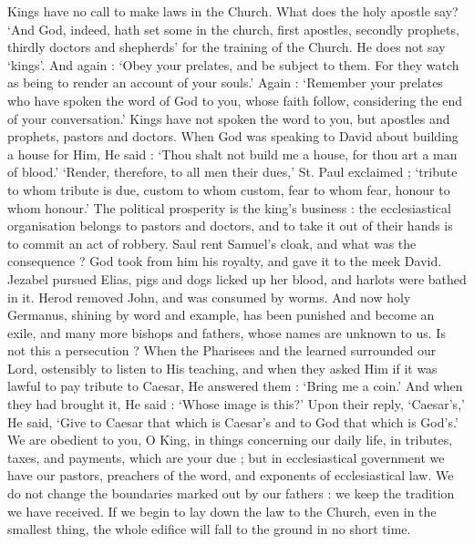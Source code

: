 \documentclass[10pt]{book}
\newcommand{\switchGreek}[1][]{\selectlanguage{polutonikogreek} \switchcolumn*[#1]}
\begin{document}
\begin{paracol}{2}
Kings have no call to make laws in the 
Church. What does the holy apostle say? 
`And God, indeed, hath set some in the church, 
first apostles, secondly prophets, thirdly doctors 
and shepherds' for the training of the Church. 
He does not say `kings'. And again : `Obey 
your prelates, and be subject to them. For 
they watch as being to render an account of 
your souls.' Again : `Remember your prelates 
who have spoken the word of God to you, 
whose faith follow, considering the end of your 
conversation.' Kings have not spoken the 
word to you, but apostles and prophets, 
pastors and doctors. When God was speaking 
to David about building a house for Him, He 
said : `Thou shalt not build me a house, for 
thou art a man of blood.' `Render, therefore, 
to all men their dues,' St. Paul exclaimed ; 
`tribute to whom tribute is due, custom to 
whom custom, fear to whom fear, honour to 
whom honour.' The political prosperity is the 
king's business : the ecclesiastical organisation 
belongs to pastors and doctors, and to take it 
out of their hands is to commit an act of 
robbery. Saul rent Samuel's cloak, and what 
was the consequence ? God took from him his 
royalty, and gave it to the meek David. 
Jezabel pursued Elias, pigs and dogs licked up 
her blood, and harlots were bathed in it. 
Herod removed John, and was consumed by 
worms. And now holy Germanus, shining by 
word and example, has been punished and 
become an exile, and many more bishops and 
fathers, whose names are unknown to us. Is 
not this a persecution ? When the Pharisees 
and the learned surrounded our Lord, ostensibly 
to listen to His teaching, and when they asked 
Him if it was lawful to pay tribute to Caesar, 
He answered them : `Bring me a coin.' And 
when they had brought it, He said : `Whose 
image is this?' Upon their reply, `Caesar's,' 
He said, `Give to Caesar that which is Caesar's 
and to God that which is God's.' We are 
obedient to you, O King, in things concerning 
our daily life, in tributes, taxes, and payments, 
which are your due ; but in ecclesiastical 
government we have our pastors, preachers of 
the word, and exponents of ecclesiastical law. 
We do not change the boundaries marked out 
by our fathers : we keep the tradition we have 
received. If we begin to lay down the law to 
the Church, even in the smallest thing, the 
whole edifice will fall to the ground in no 
short time. 

\switchGreek


\end{paracol}
\end{document}
